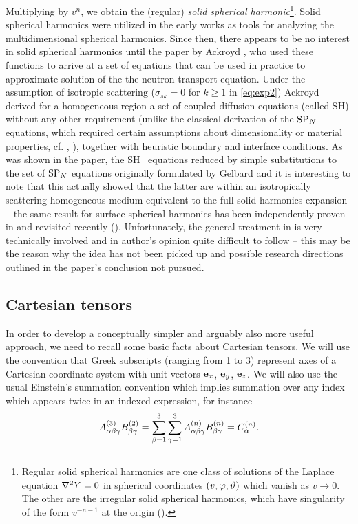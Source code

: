 Multiplying by $v^n$, we obtain the (regular) \textit{solid spherical harmonic}\footnote{Regular solid spherical
harmonics are one class of solutions of the Laplace equation $\lap Y = 0$ in spherical coordinates
$(v,\azimuthal,\polar)$ which vanish as $v\to 0$. The other are the irregular solid spherical harmonics, which have
singularity of the form $v^{-n-1}$ at the origin (\cite[Chap. VI]{Byerly}).}. Solid spherical harmonics were utilized
in the early works \cite{Davison, Rumyantsev} as tools for analyzing the multidimensional spherical harmonics. Since
then, there appears to be no interest in solid spherical harmonics until the paper by Ackroyd \cite{Ackroyd1}, who used
these functions to arrive at a set of equations that can be used in practice to approximate solution of the the neutron 
transport equation. Under the assumption of isotropic scattering ($\sigma_{sk} = 0$ for $k \geq 1$ in \eqref{eq:exp2}) 
Ackroyd derived for a homogeneous region a set of coupled diffusion equations (called SH\PN) without any other
requirement (unlike the classical derivation of the $\SPN$ equations, which required certain assumptions about 
dimensionality or material properties, cf. \cite{Larsen1}, \cite{Pomraning1}), together with heuristic boundary and
interface conditions. As was shown in the paper, the SH\PN~ equations reduced by simple substitutions to the set of 
$\SPN$ equations originally formulated by Gelbard and it is interesting to note that this actually showed that the 
latter are within an isotropically scattering homogeneous medium equivalent to the full solid harmonics expansion -- 
the same result for surface spherical harmonics has been independently proven in \cite{Coppa1} and revisited recently 
(\cite{Coppa2,McClarren1}). Unfortunately, the general treatment in \cite{Ackroyd1} is very technically involved and in 
author's opinion quite difficult to follow -- this may be the reason why the idea has not been picked up and possible 
research directions outlined in the paper's conclusion not pursued.

\subsection{Cartesian tensors}\label{sec:tensors}
In order to develop a conceptually simpler and arguably also more useful approach, we need to recall some basic facts
about Cartesian tensors. We will use the convention that Greek subscripts (ranging from 1 to 3) represent axes of a
Cartesian coordinate system with unit vectors $\be_x$, $\be_y$, $\be_z$. We will also use the usual Einstein's summation convention which
implies summation over any index which appears twice in an indexed expression, for instance $$
  \AAA[3]{\alpha\beta\gamma}\BBB[2]{\beta\gamma} =
  \suma[\beta]{1}{3}\suma[\gamma]{1}{3}\AAA{\alpha\beta\gamma}\BBB{\beta\gamma} = \CCC{\alpha}.
$$

